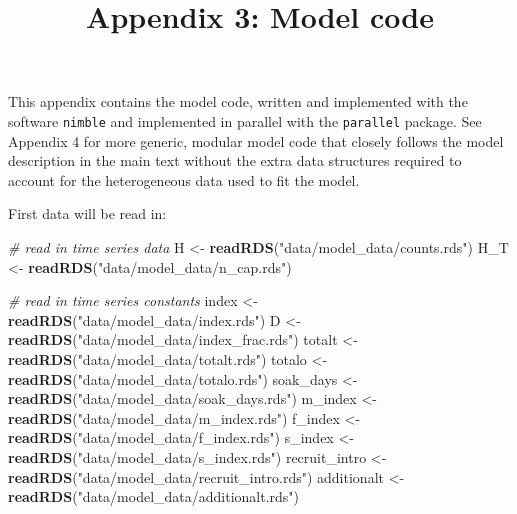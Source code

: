 \documentclass[
]{article}
\title{Appendix 3: Model code}
\author{}
\date{\vspace{-2.5em}}
\newenvironment{Shaded}{\begin{snugshade}}{\end{snugshade}}
\newcommand{\CommentTok}[1]{\textcolor[rgb]{0.56,0.35,0.01}{\textit{#1}}}
\newcommand{\FunctionTok}[1]{\textcolor[rgb]{0.13,0.29,0.53}{\textbf{#1}}}
\newcommand{\NormalTok}[1]{#1}
\newcommand{\OtherTok}[1]{\textcolor[rgb]{0.56,0.35,0.01}{#1}}
\newcommand{\StringTok}[1]{\textcolor[rgb]{0.31,0.60,0.02}{#1}}
\begin{document}
\maketitle

This appendix contains the model code, written and implemented with the
software \texttt{nimble} and implemented in parallel with the
\texttt{parallel} package. See Appendix 4 for more generic, modular
model code that closely follows the model description in the main text
without the extra data structures required to account for the
heterogeneous data used to fit the model.

First data will be read in:

\begin{Shaded}
\begin{Highlighting}[]
\CommentTok{\# read in time series data}
\NormalTok{H }\OtherTok{\textless{}{-}} \FunctionTok{readRDS}\NormalTok{(}\StringTok{"data/model\_data/counts.rds"}\NormalTok{)}
\NormalTok{H\_T }\OtherTok{\textless{}{-}} \FunctionTok{readRDS}\NormalTok{(}\StringTok{"data/model\_data/n\_cap.rds"}\NormalTok{)}

\CommentTok{\# read in time series constants}
\NormalTok{index }\OtherTok{\textless{}{-}} \FunctionTok{readRDS}\NormalTok{(}\StringTok{"data/model\_data/index.rds"}\NormalTok{)}
\NormalTok{D }\OtherTok{\textless{}{-}} \FunctionTok{readRDS}\NormalTok{(}\StringTok{"data/model\_data/index\_frac.rds"}\NormalTok{)}
\NormalTok{totalt }\OtherTok{\textless{}{-}} \FunctionTok{readRDS}\NormalTok{(}\StringTok{"data/model\_data/totalt.rds"}\NormalTok{)}
\NormalTok{totalo }\OtherTok{\textless{}{-}} \FunctionTok{readRDS}\NormalTok{(}\StringTok{"data/model\_data/totalo.rds"}\NormalTok{)}
\NormalTok{soak\_days }\OtherTok{\textless{}{-}} \FunctionTok{readRDS}\NormalTok{(}\StringTok{"data/model\_data/soak\_days.rds"}\NormalTok{)}
\NormalTok{m\_index }\OtherTok{\textless{}{-}} \FunctionTok{readRDS}\NormalTok{(}\StringTok{"data/model\_data/m\_index.rds"}\NormalTok{)}
\NormalTok{f\_index }\OtherTok{\textless{}{-}} \FunctionTok{readRDS}\NormalTok{(}\StringTok{"data/model\_data/f\_index.rds"}\NormalTok{)}
\NormalTok{s\_index }\OtherTok{\textless{}{-}} \FunctionTok{readRDS}\NormalTok{(}\StringTok{"data/model\_data/s\_index.rds"}\NormalTok{)}
\NormalTok{recruit\_intro }\OtherTok{\textless{}{-}} \FunctionTok{readRDS}\NormalTok{(}\StringTok{"data/model\_data/recruit\_intro.rds"}\NormalTok{)}
\NormalTok{additionalt }\OtherTok{\textless{}{-}} \FunctionTok{readRDS}\NormalTok{(}\StringTok{"data/model\_data/additionalt.rds"}\NormalTok{)}


\end{Highlighting}
\end{Shaded}
\end{document}
